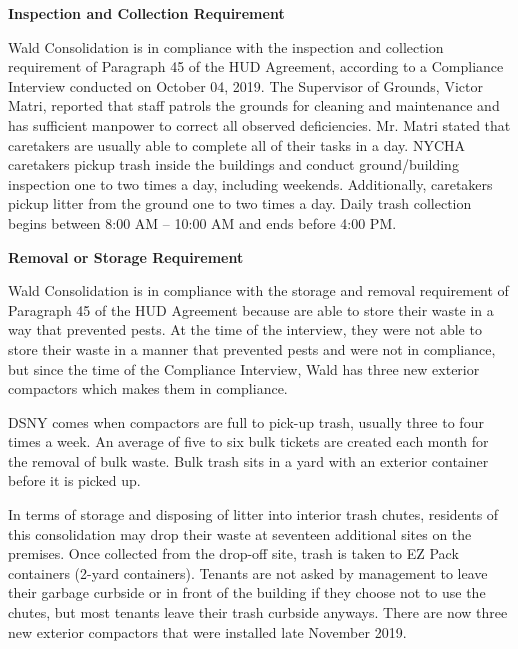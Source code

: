 
\textbf{Inspection and Collection Requirement} 

Wald Consolidation is in compliance with the inspection and collection requirement of Paragraph 45 of the HUD Agreement, according to a Compliance Interview conducted on October 04, 2019. The Supervisor of Grounds, Victor Matri, reported that staff patrols the grounds for cleaning and maintenance and has sufficient manpower to correct all observed deficiencies. Mr. Matri stated that caretakers are usually able to complete all of their tasks in a day.  NYCHA caretakers pickup trash inside the buildings and conduct ground/building inspection one to two times a day, including weekends. Additionally, caretakers pickup litter from the ground one to two times a day. Daily trash collection begins between 8:00 AM -- 10:00 AM and ends before 4:00 PM. 

 

\textbf{Removal or Storage Requirement} 

Wald Consolidation is in compliance with the storage and removal requirement of Paragraph 45 of the HUD Agreement because are able to store their waste in a way that prevented pests. At the time of the interview, they were not able to store their waste in a manner that prevented pests and were not in compliance, but since the time of the Compliance Interview, Wald has three new exterior compactors which makes them in compliance. 

DSNY comes when compactors are full to pick-up trash, usually three to four times a week. An average of five to six bulk tickets are created each month for the removal of bulk waste. Bulk trash sits in a yard with an exterior container before it is picked up.  

 

In terms of storage and disposing of litter into interior trash chutes, residents of this consolidation may drop their waste at seventeen additional sites on the premises. Once collected from the drop-off site, trash is taken to EZ Pack containers (2-yard containers). Tenants are not asked by management to leave their garbage curbside or in front of the building if they choose not to use the chutes, but most tenants leave their trash curbside anyways. There are now three new exterior compactors that were installed late November 2019. 

 

